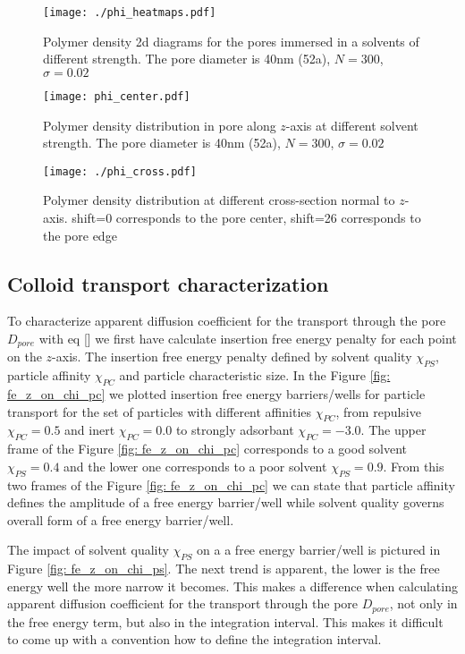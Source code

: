 \documentclass[12pt,a4paper]{article}
\begin{document}
\begin{figure}
    \texttt{[image: ./phi\_heatmaps.pdf]}
    \caption[]{Polymer density 2d diagrams for the pores immersed in a solvents of different strength. 
    The pore diameter is 40nm (52a), $N=300$, $\sigma=0.02$}
    \label{fig: phi2d_close}
\end{figure}

\begin{figure}
    \texttt{[image: phi\_center.pdf]}
    \caption[]{Polymer density distribution in pore along $z$-axis at different solvent strength.
    The pore diameter is 40nm (52a), $N=300$, $\sigma=0.02$}
    \label{fig: phi_z}
\end{figure}

\begin{figure}
    \texttt{[image: ./phi\_cross.pdf]}
    \caption{Polymer density distribution at different cross-section normal to $z$-axis. 
    shift=0 corresponds to the pore center, shift=26 corresponds to the pore edge}
    \label{fig: phi_cross}
\end{figure}

\subsection{Colloid transport characterization}

To characterize apparent diffusion coefficient for the transport through the pore $D_{pore}$ with eq [] we first have calculate insertion free energy penalty for each point on the $z$-axis.
The insertion free energy penalty defined by solvent quality $\chi_{PS}$, particle affinity $\chi_{PC}$ and particle characteristic size.
In the Figure \ref{fig: fe_z_on_chi_pc} we plotted insertion free energy barriers/wells for particle transport for the set of particles with different affinities $\chi_{PC}$, from repulsive $\chi_{PC} =0.5$ and inert $\chi_{PC} =0.0$ to strongly adsorbant $\chi_{PC} =-3.0$.
The upper frame of the Figure \ref{fig: fe_z_on_chi_pc} corresponds to a good solvent $\chi_{PS} =0.4$ and
the lower one corresponds to a poor solvent $\chi_{PS} =0.9$. 
From this two frames of the Figure \ref{fig: fe_z_on_chi_pc} we can state that particle affinity defines the amplitude of a free energy barrier/well while solvent quality governs overall form of a free energy barrier/well.

The impact of solvent quality $\chi_{PS}$ on a a free energy barrier/well is pictured in Figure \ref{fig: fe_z_on_chi_ps}.
The next trend is apparent, the lower is the free energy well the more narrow it becomes.
This makes a difference when calculating apparent diffusion coefficient for the transport through the pore $D_{pore}$, not only in the free energy term, but also in the integration interval.
This makes it difficult to come up with a convention how to define the integration interval.
\end{document}

